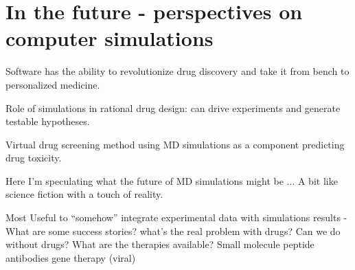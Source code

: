 



\section{In the future - perspectives on computer simulations}



Software has the ability to revolutionize drug discovery and take it from bench to personalized medicine.  

Role of simulations in rational drug design: can drive experiments and generate testable hypotheses.

Virtual drug screening method using MD simulations as a component predicting drug toxicity.

Here I'm speculating what the future of MD simulations might be ... A bit like science fiction with a touch of reality.

Most Useful to “somehow” integrate experimental data with simulations results\cite{that nature paper discussing integrating MD and systems biology}
- What are some success stories?
what’s the real problem with drugs?
Can we do without drugs? What are the therapies available?
Small molecule
peptide
antibodies
gene therapy (viral)
\cite{Hansen:2012hh}

